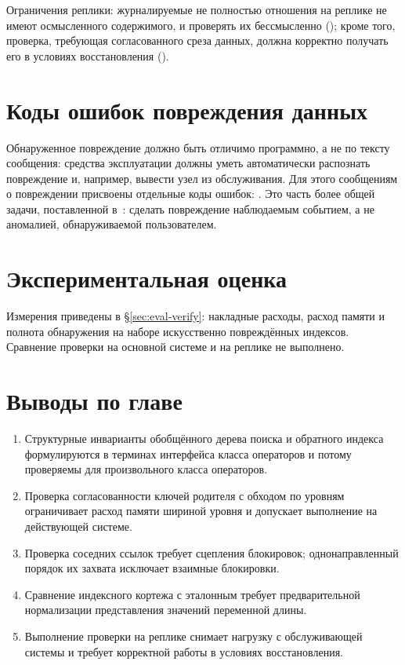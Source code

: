 Ограничения реплики: журналируемые не полностью отношения на реплике не имеют
осмысленного содержимого, и проверять их бессмысленно
();
кроме того, проверка, требующая согласованного среза данных, должна корректно
получать его в условиях восстановления
().

\section{Коды ошибок повреждения данных}

Обнаруженное повреждение должно быть отличимо программно, а не по тексту
сообщения: средства эксплуатации должны уметь автоматически распознать
повреждение и, например, вывести узел из обслуживания. Для этого сообщениям о
повреждении присвоены отдельные коды ошибок:
.
Это часть более общей задачи, поставленной в~\cite{borodin2016debug}: сделать
повреждение наблюдаемым событием, а не аномалией, обнаруживаемой пользователем.

\section{Экспериментальная оценка}

Измерения приведены в §\ref{sec:eval-verify}: накладные расходы, расход памяти
и полнота обнаружения на наборе искусственно повреждённых индексов. Сравнение
проверки на основной системе и на реплике не выполнено.

\section{Выводы по главе}

\begin{enumerate}
\item Структурные инварианты обобщённого дерева поиска и обратного индекса
      формулируются в терминах интерфейса класса операторов и потому проверяемы
      для произвольного класса операторов.
\item Проверка согласованности ключей родителя с обходом по уровням ограничивает
      расход памяти шириной уровня и допускает выполнение на действующей
      системе.
\item Проверка соседних ссылок требует сцепления блокировок; однонаправленный
      порядок их захвата исключает взаимные блокировки.
\item Сравнение индексного кортежа с эталонным требует предварительной
      нормализации представления значений переменной длины.
\item Выполнение проверки на реплике снимает нагрузку с обслуживающей системы и
      требует корректной работы в условиях восстановления.
\end{enumerate}
